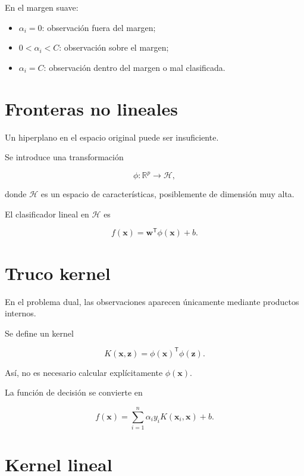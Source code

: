 \documentclass[
  spanish,
  10.5pt,
  letterpaper,
  DIV=11,
  numbers=noendperiod,
  oneside,
  open=any]{scrreprt}
\providecommand{\tightlist}{%
  \setlength{\itemsep}{0pt}\setlength{\parskip}{0pt}}
\theoremstyle{definition}
\theoremstyle{definition}
\theoremstyle{plain}
\theoremstyle{remark}
\begin{document}

En el margen suave:

\begin{itemize}
\tightlist
\item
  \(\alpha_i=0\): observación fuera del margen;
\item
  \(0<\alpha_i<C\): observación sobre el margen;
\item
  \(\alpha_i=C\): observación dentro del margen o mal clasificada.
\end{itemize}

\section*{Fronteras no lineales}\label{fronteras-no-lineales}


Un hiperplano en el espacio original puede ser insuficiente.

Se introduce una transformación

\[
\phi:\mathbb{R}^{p}\to\mathcal{H},
\]

donde \(\mathcal{H}\) es un espacio de características, posiblemente de
dimensión muy alta.

El clasificador lineal en \(\mathcal{H}\) es

\[
f(\mathbf{x})
=
\mathbf{w}^{\mathsf T}\phi(\mathbf{x})+b.
\]

\section*{Truco kernel}\label{truco-kernel}


En el problema dual, las observaciones aparecen únicamente mediante
productos internos.

Se define un kernel

\[
K(\mathbf{x},\mathbf{z})
=
\phi(\mathbf{x})^{\mathsf T}
\phi(\mathbf{z}).
\]

Así, no es necesario calcular explícitamente \(\phi(\mathbf{x})\).

La función de decisión se convierte en

\[
f(\mathbf{x})
=
\sum_{i=1}^{n}
\alpha_i y_i
K(\mathbf{x}_i,\mathbf{x})
+b.
\]

\section*{Kernel lineal}\label{kernel-lineal}
\end{document}
